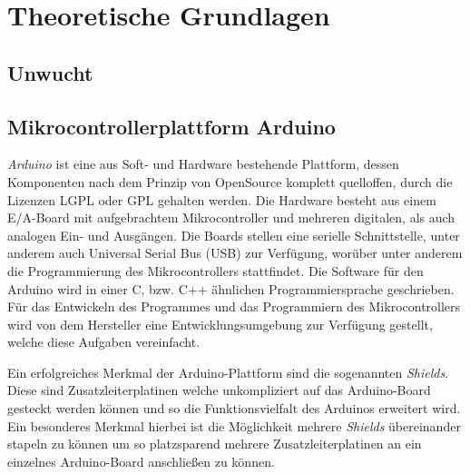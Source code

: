 
\chapter{Theoretische Grundlagen}

\section{Unwucht}

\section{Mikrocontrollerplattform Arduino}
\textit{Arduino} ist eine aus Soft- und Hardware bestehende Plattform, dessen Komponenten nach dem Prinzip von OpenSource komplett quelloffen, durch die Lizenzen \ac{LGPL} oder \ac{GPL} gehalten werden. Die Hardware besteht aus einem E/A-Board mit aufgebrachtem Mikrocontroller und mehreren digitalen, als auch analogen Ein- und Ausgängen. Die Boards stellen eine serielle Schnittstelle, unter anderem auch Universal Serial Bus (USB) zur Verfügung, worüber unter anderem die Programmierung des Mikrocontrollers stattfindet. Die Software für den Arduino wird in einer C, bzw. C++ ähnlichen Programmiersprache geschrieben. Für das Entwickeln des Programmes und das Programmiern des Mikrocontrollers wird von dem Hersteller eine Entwicklungsumgebung zur Verfügung gestellt, welche diese Aufgaben vereinfacht.

Ein erfolgreiches Merkmal der Arduino-Plattform sind die sogenannten \textit{Shields}. Diese sind Zusatzleiterplatinen welche unkompliziert auf das Arduino-Board gesteckt werden können und so die Funktionsvielfalt des Arduinos erweitert wird. Ein besonderes Merkmal hierbei ist die Möglichkeit mehrere \textit{Shields} übereinander stapeln zu können um so platzsparend mehrere Zusatzleiterplatinen an ein einzelnes Arduino-Board anschließen zu können.

